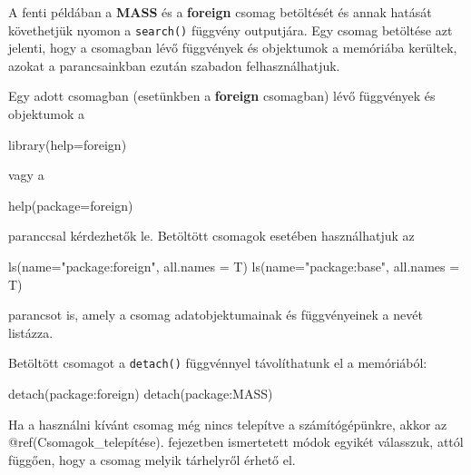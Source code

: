 \documentclass[
]{book}
\newenvironment{Shaded}{\begin{snugshade}}{\end{snugshade}}
\newcommand{\AttributeTok}[1]{\textcolor[rgb]{0.77,0.63,0.00}{#1}}
\newcommand{\FunctionTok}[1]{\textcolor[rgb]{0.00,0.00,0.00}{#1}}
\newcommand{\NormalTok}[1]{#1}
\newcommand{\SpecialCharTok}[1]{\textcolor[rgb]{0.00,0.00,0.00}{#1}}
\newcommand{\StringTok}[1]{\textcolor[rgb]{0.31,0.60,0.02}{#1}}
\begin{document}
A fenti példában a \textbf{MASS} és a \textbf{foreign} csomag betöltését és annak hatását követhetjük nyomon a \texttt{search()} függvény outputjára. Egy csomag betöltése azt jelenti, hogy a csomagban lévő függvények és objektumok a memóriába kerültek, azokat a parancsainkban ezután szabadon felhasználhatjuk.

Egy adott csomagban (esetünkben a \textbf{foreign} csomagban) lévő függvények és objektumok a

\begin{Shaded}
\begin{Highlighting}[]
\FunctionTok{library}\NormalTok{(}\AttributeTok{help=}\NormalTok{foreign)}
\end{Highlighting}
\end{Shaded}

vagy a

\begin{Shaded}
\begin{Highlighting}[]
\FunctionTok{help}\NormalTok{(}\AttributeTok{package=}\NormalTok{foreign)}
\end{Highlighting}
\end{Shaded}

paranccsal kérdezhetők le. Betöltött csomagok esetében használhatjuk az

\begin{Shaded}
\begin{Highlighting}[]
\FunctionTok{ls}\NormalTok{(}\AttributeTok{name=}\StringTok{"package:foreign"}\NormalTok{, }\AttributeTok{all.names =}\NormalTok{ T)}
\FunctionTok{ls}\NormalTok{(}\AttributeTok{name=}\StringTok{"package:base"}\NormalTok{, }\AttributeTok{all.names =}\NormalTok{ T)}
\end{Highlighting}
\end{Shaded}

parancsot is, amely a csomag adatobjektumainak és függvényeinek a nevét listázza.

Betöltött csomagot a \texttt{detach()} függvénnyel távolíthatunk el a memóriából:

\begin{Shaded}
\begin{Highlighting}[]
\FunctionTok{detach}\NormalTok{(package}\SpecialCharTok{:}\NormalTok{foreign)}
\FunctionTok{detach}\NormalTok{(package}\SpecialCharTok{:}\NormalTok{MASS)}
\end{Highlighting}
\end{Shaded}

Ha a használni kívánt csomag még nincs telepítve a számítógépünkre, akkor az @ref(Csomagok\_telepítése). fejezetben ismertetett módok egyikét válasszuk, attól függően, hogy a csomag melyik tárhelyről érhető el.
\end{document}
